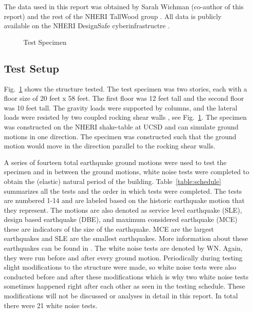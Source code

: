 \documentclass{article}
\begin{document}
\medskip

The data used in this report was obtained by Sarah Wichman (co-author of this report) and the rest of the NHERI TallWood group \cite{TallWood}. All data is publicly available on the NHERI DesignSafe cyberinfrastructre \cite{DesignSafe}.

\begin{figure}[!htbp]
    \centering
    \qquad
    \caption{Test Specimen \cite{Wichman}}
    \label{fig:Building}
\end{figure}

\subsection{Test Setup}

Fig.\  \ref{fig:Building} shows the structure tested. The test specimen was two stories, each with a floor size of 20 feet x 58 feet. The first floor was 12 feet tall and the second floor was 10 feet tall. The gravity loads were supported by columns, and the lateral loads were resisted by two coupled rocking shear walls \cite{Wichman}, see Fig.\ \ref{fig:Building}. The specimen was constructed on the NHERI shake-table at UCSD and can simulate ground motions in one direction. The specimen was constructed such that the ground motion would move in the direction parallel to the rocking shear walls.

\medskip

A series of fourteen total earthquake ground motions were used to test the specimen and in between the ground motions, white noise tests were completed to obtain the (elastic) natural period of the building. Table~\ref{table:schedule} summarizes all the tests and the order in which tests were completed. The tests are numbered 1-14 and are labeled based on the historic earthquake motion that they represent. The motions are also denoted as service level earthquake (SLE), design based earthquake (DBE), and maximum considered earthquake (MCE) these are indicators of the size of the earthquake. MCE are the largest earthquakes and SLE are the smallest earthquakes. More information about these earthquakes can be found in \cite{Wichman}. The white noise tests are denoted by WN. Again, they were run before and after every ground motion. Periodically during testing slight modifications to the structure were made, so white noise tests were also conducted before and after these modifications which is why two white noise tests sometimes happened right after each other as seen in the testing schedule. These modifications will not be discussed or analyses in detail in this report. In total there were 21 white noise tests. 
\end{document}

